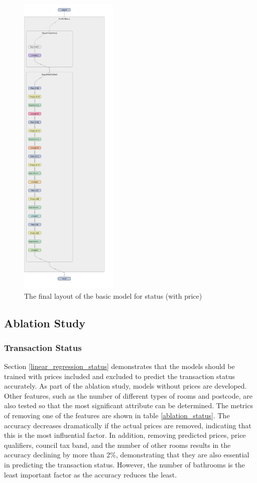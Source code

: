 \documentclass[12pt,twoside]{report}
\begin{document}
\begin{figure}[H]
	\centering
	\includegraphics[height=15cm]{basic_status_final_layout}
	\caption{The final layout of the basic model for status (with price)}
	\label{basic_status_final_layout}
\end{figure}

\subsection{Ablation Study}
\subsubsection{Transaction Status}
Section \ref{linear_regression_status} demonstrates that the models should be trained with prices included and excluded to predict the transaction status accurately. As part of the ablation study, models without prices are developed. Other features, such as the number of different types of rooms and postcode, are also tested so that the most significant attribute can be determined. The metrics of removing one of the features are shown in table \ref{ablation_status}. The accuracy decreases dramatically if the actual prices are removed, indicating that this is the most influential factor. In addition, removing predicted prices, price qualifiers, council tax band, and the number of other rooms results in the accuracy declining by more than 2\%, demonstrating that they are also essential in predicting the transaction status. However, the number of bathrooms is the least important factor as the accuracy reduces the least.
\end{document}
